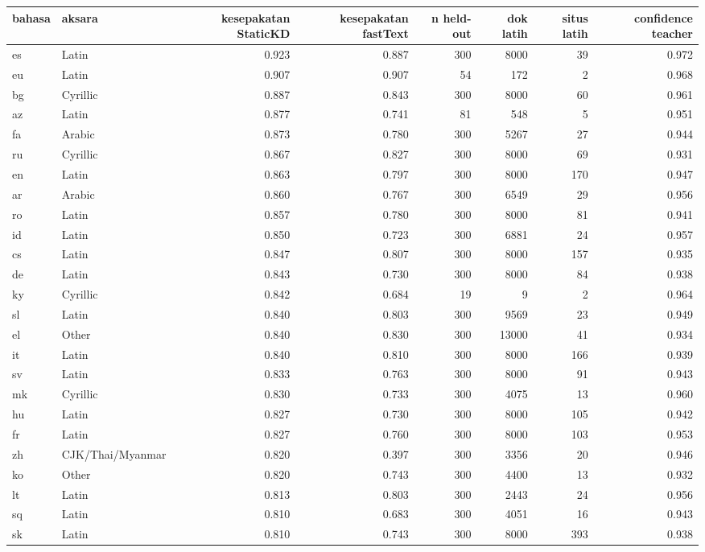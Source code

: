 \begin{tabular}{llrrrrrr}
\toprule
bahasa & aksara & kesepakatan StaticKD & kesepakatan fastText & n held-out & dok latih & situs latih & confidence teacher \\
\midrule
es & Latin & 0.923 & 0.887 & 300 & 8000 & 39 & 0.972 \\
eu & Latin & 0.907 & 0.907 & 54 & 172 & 2 & 0.968 \\
bg & Cyrillic & 0.887 & 0.843 & 300 & 8000 & 60 & 0.961 \\
az & Latin & 0.877 & 0.741 & 81 & 548 & 5 & 0.951 \\
fa & Arabic & 0.873 & 0.780 & 300 & 5267 & 27 & 0.944 \\
ru & Cyrillic & 0.867 & 0.827 & 300 & 8000 & 69 & 0.931 \\
en & Latin & 0.863 & 0.797 & 300 & 8000 & 170 & 0.947 \\
ar & Arabic & 0.860 & 0.767 & 300 & 6549 & 29 & 0.956 \\
ro & Latin & 0.857 & 0.780 & 300 & 8000 & 81 & 0.941 \\
id & Latin & 0.850 & 0.723 & 300 & 6881 & 24 & 0.957 \\
cs & Latin & 0.847 & 0.807 & 300 & 8000 & 157 & 0.935 \\
de & Latin & 0.843 & 0.730 & 300 & 8000 & 84 & 0.938 \\
ky & Cyrillic & 0.842 & 0.684 & 19 & 9 & 2 & 0.964 \\
sl & Latin & 0.840 & 0.803 & 300 & 9569 & 23 & 0.949 \\
el & Other & 0.840 & 0.830 & 300 & 13000 & 41 & 0.934 \\
it & Latin & 0.840 & 0.810 & 300 & 8000 & 166 & 0.939 \\
sv & Latin & 0.833 & 0.763 & 300 & 8000 & 91 & 0.943 \\
mk & Cyrillic & 0.830 & 0.733 & 300 & 4075 & 13 & 0.960 \\
hu & Latin & 0.827 & 0.730 & 300 & 8000 & 105 & 0.942 \\
fr & Latin & 0.827 & 0.760 & 300 & 8000 & 103 & 0.953 \\
zh & CJK/Thai/Myanmar & 0.820 & 0.397 & 300 & 3356 & 20 & 0.946 \\
ko & Other & 0.820 & 0.743 & 300 & 4400 & 13 & 0.932 \\
lt & Latin & 0.813 & 0.803 & 300 & 2443 & 24 & 0.956 \\
sq & Latin & 0.810 & 0.683 & 300 & 4051 & 16 & 0.943 \\
sk & Latin & 0.810 & 0.743 & 300 & 8000 & 393 & 0.938 \\

\end{tabular}
